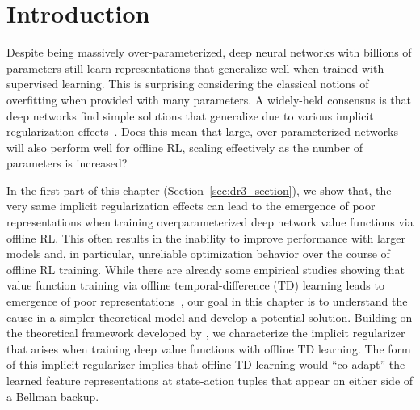 \vspace{-0.2cm}
\section{Introduction}
\vspace{-0.2cm}

Despite being massively over-parameterized, deep neural networks with billions of parameters still learn representations that generalize well when trained with supervised learning. This is surprising considering the classical notions of overfitting when provided with many parameters. A widely-held consensus is that deep networks find simple solutions that generalize due to various implicit regularization effects~\citep{blanc2020implicit, woodworth2020kernel, arora2018optimization, gunasekar2017implicit, wei2019regularization, li2019towards}. Does this mean that large, over-parameterized networks will also perform well for offline RL, scaling effectively as the number of parameters is increased?

In the first part of this chapter (Section~\ref{sec:dr3_section}), we show that, the very same implicit regularization effects can lead to the emergence of poor representations when training overparameterized deep network value functions via offline RL. This often results in the inability to improve performance with larger models and, in particular, unreliable optimization behavior over the course of offline RL training. While there are already some empirical studies showing that value function training via offline temporal-difference (TD) learning leads to emergence of poor representations~\citep{kumar2021implicit}, our goal in this chapter is to understand the cause in a simpler theoretical model and develop a potential solution. Building on the theoretical framework developed by \citet{blanc2020implicit,damian2021label}, we characterize the implicit regularizer that arises when training deep value functions with offline TD learning. The form of this implicit regularizer implies that offline TD-learning would ``co-adapt'' the learned feature representations at state-action tuples that appear on either side of a Bellman backup.

